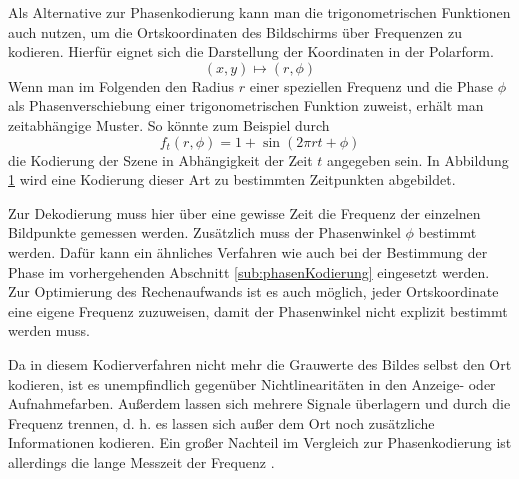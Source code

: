 Als Alternative zur Phasenkodierung kann man die trigonometrischen Funktionen auch nutzen, um die Ortskoordinaten des Bildschirms über Frequenzen zu kodieren.
Hierfür eignet sich die Darstellung der Koordinaten in der Polarform.
%
\begin{equation*}
	\left(x,y\right) \mapsto \left(r,\phi\right)
\end{equation*}
%
Wenn man im Folgenden den Radius $r$ einer speziellen Frequenz und die Phase $\phi$ als Phasenverschiebung einer trigonometrischen Funktion zuweist, erhält man zeitabhängige Muster.
So könnte zum Beispiel durch
%
\begin{equation*}
	f_t \left(r,\phi\right) = 1 + \sin \left(2 \pi r t + \phi \right)
\end{equation*}
%
die Kodierung der Szene in Abhängigkeit der Zeit $t$ angegeben sein.
In Abbildung \ref{tikz:abbFrequenzkodierteMuster} wird eine Kodierung dieser Art zu bestimmten Zeitpunkten abgebildet.
%
\begin{figure}[H]
	\centering
	
	\label{tikz:abbFrequenzkodierteMuster}
\end{figure}
%
\noindent
Zur Dekodierung muss hier über eine gewisse Zeit die Frequenz der einzelnen Bildpunkte gemessen werden.
Zusätzlich muss der Phasenwinkel $\phi$ bestimmt werden.
Dafür kann ein ähnliches Verfahren wie auch bei der Bestimmung der Phase im vorhergehenden Abschnitt \ref{sub:phasenKodierung} eingesetzt werden.
Zur Optimierung des Rechenaufwands ist es auch möglich, jeder Ortskoordinate eine eigene Frequenz zuzuweisen, damit der Phasenwinkel nicht explizit bestimmt werden muss.

\p
Da in diesem Kodierverfahren nicht mehr die Grauwerte des Bildes selbst den Ort kodieren, ist es unempfindlich gegenüber Nichtlinearitäten in den Anzeige- oder Aufnahmefarben.
Außerdem lassen sich mehrere Signale überlagern und durch die Frequenz trennen, d. h. es lassen sich außer dem Ort noch zusätzliche Informationen kodieren.
Ein großer Nachteil im Vergleich zur Phasenkodierung ist allerdings die lange Messzeit der Frequenz \cite{jenaerOK}.